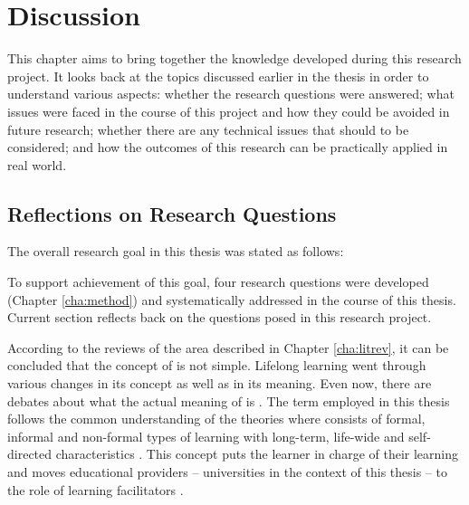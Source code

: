 \chapter{Discussion\label{cha:discussion}}
This chapter aims to bring together the knowledge developed during this research
project. It looks back at the topics discussed earlier in the thesis in order to
understand various aspects: whether the research questions were answered; what
issues were faced in the course of this project and how they could be avoided in
future research; whether there are any technical issues that should to be
considered; and how the outcomes of this research can be practically applied in
real world.

\section{Reflections on Research Questions}

The overall research goal in this thesis was stated as follows:


To support achievement of this goal, four research questions were developed
(Chapter \ref{cha:method}) and systematically addressed in the course of this
thesis. Current section reflects back on the questions posed in this research
project.


According to the reviews of the area described in Chapter \ref{cha:litrev}, it
can be concluded that the concept of \LLLs is not simple. Lifelong learning
went through various changes in its concept as well as in its meaning. Even now,
there are debates about what the actual meaning of \LLLs is \citep{Griffin2002}.
The term employed in this thesis follows the common understanding of the
theories where \LLLs consists of formal, informal and non-formal types of
learning with long-term, life-wide and self-directed characteristics
\citep{Longworth2003,Rubenson2002,Schuetze2006}. This concept puts the learner
in charge of their learning and moves educational providers -- universities in
the context of this thesis -- to the role of learning facilitators
\citep{Boshier2000}.

